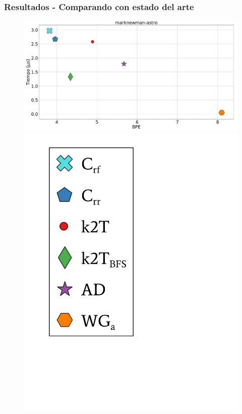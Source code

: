 \begin{frame}
\frametitle{Resultados - Comparando con estado del arte}

\begin{figure}
	\centering
	
    	\begin{minipage}{1\textwidth}
    		\centering
    		\begin{minipage}{0.8\textwidth}
    			\centering
    			\includegraphics[width=1\linewidth]{../img/bpeTimes/aleatorio/marknewman-astro.pdf}
    		\end{minipage}
    		\begin{minipage}{0.15\textwidth}
    			\centering
    			\includegraphics[scale=.16, clip, trim=70 200 280 40]{../img/bpeTimes/labelAle.pdf}
    		\end{minipage}	
    	\end{minipage}


\end{figure}
\end{frame}
